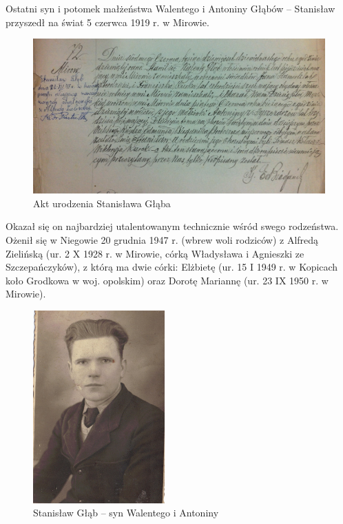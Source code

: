 Ostatni syn i potomek małżeństwa Walentego i Antoniny Głąbów -- Stanisław przyszedł na świat 5 czerwca 1919 r. w Mirowie. 

\begin{figure}[!h]
\begin{center}
\includegraphics[width=\textwidth]{zdjecia/akt_urodzenia_stanislawa_glaba.jpg}
\caption{Akt urodzenia Stanisława Głąba}
\label{rys:akt_urodzenia_stanislawa_glaba}
\end{center}
\end{figure}


Okazał się on najbardziej utalentowanym technicznie wśród swego rodzeństwa. Ożenił się w Niegowie 20 grudnia 1947 r. (wbrew woli rodziców) z Alfredą Zielińską (ur. 2 X 1928 r. w Mirowie, córką Władysława i Agnieszki ze Szczepańczyków), z którą ma dwie córki: Elżbietę (ur. 15 I 1949 r. w Kopicach koło Grodkowa w woj. opolskim) oraz Dorotę Mariannę (ur. 23 IX 1950 r. w Mirowie). 


\begin{figure}[!ht]
\begin{center}
\includegraphics[width=0.45\textwidth]{zdjecia/stanislaw_glab.jpg}
\caption[Stanisław Głąb]{Stanisław Głąb -- syn Walentego i Antoniny}
\label{rys:stanislaw_glab}
\end{center}
\end{figure}

